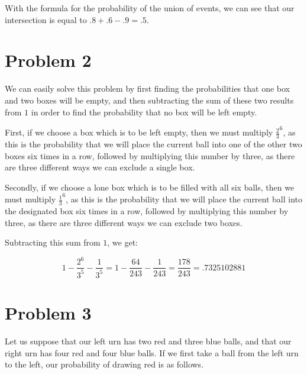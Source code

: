 \documentclass[12pt,a5paper]{article}
\begin{document}
With the formula for the probability of the union of events, we can see that our intersection is equal to $.8+.6-.9 = .5$.

\begin{center}
\end{center}

\section*{Problem 2}
We can easily solve this problem by first finding the probabilities that one box and two boxes will be empty, and then subtracting the sum of these two results from $1$ in order to find the probability that no box will be left empty.

First, if we choose a box which is to be left empty, then we must multiply $\frac{2}{3}^6$, as this is the probability that we will place the current ball into one of the other two boxes six times in a row, followed by multiplying this number by three, as there are three different ways we can exclude a single box.

Secondly, if we choose a lone box which is to be filled with all six balls, then we must multiply $\frac{1}{3}^6$, as this is the probability that we will place the current ball into the designated box six times in a row, followed by multiplying this number by three, as there are three different ways we can exclude two boxes.

Subtracting this sum from $1$, we get:

\[
1 - \frac{2^6}{3^5} - \frac{1}{3^5} = 1 - \frac{64}{243} - \frac{1}{243} = \frac{178}{243} = .7325102881
\]

\section*{Problem 3}

Let us suppose that our left urn has two red and three blue balls, and that our right urn has four red and four blue balls. If we first take a ball from the left urn to the left, our probability of drawing red is as follows.
\end{document}
